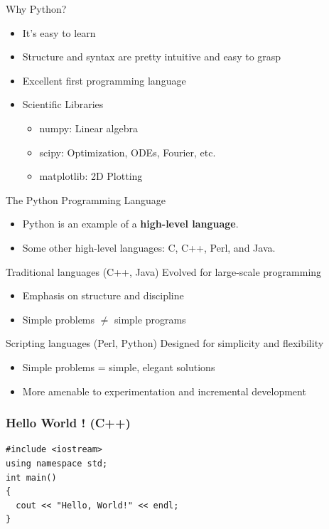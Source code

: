 \documentclass{beamer}
\begin{document}
\begin{frame}{Why Python?}
\begin{itemize} [<+->]
\item It's easy to learn
\item Structure and syntax are pretty intuitive and easy to grasp
\item Excellent first programming language
\item Scientific Libraries 
\begin{itemize} 
\item \alert{numpy}: Linear algebra
\item \alert{scipy}: Optimization, ODEs, Fourier, etc.
\item \alert{matplotlib}: 2D Plotting
\end{itemize}
\end{itemize}
\end{frame}
\begin{frame}{The Python Programming Language}{}
\begin{itemize}
 \item Python is an example of a {\bf high-level language}.
 \item   Some other high-level languages: C, C++, Perl, and Java.
\end{itemize}
\begin{block}
{Traditional languages (C++, Java)} 
Evolved for large-scale
programming 
\begin{itemize}
\item Emphasis on \alert{structure and discipline} 
\item Simple problems $\ne$ simple programs
\end{itemize}

\end{block}
\begin{block}{Scripting languages (Perl, Python)}
 Designed for
simplicity and flexibility
\begin{itemize}
\item Simple problems = simple, elegant solutions 
\item More amenable to \alert{experimentation and incremental development}
\end{itemize}
\end{block}
\end{frame}


\begin{frame}[fragile]
\frametitle{Hello World ! (C++)}
\begin{verbatim}
#include <iostream>
using namespace std;
int main()
{
  cout << "Hello, World!" << endl;  
}
\end{verbatim}  
\end{frame}
\end{document}
